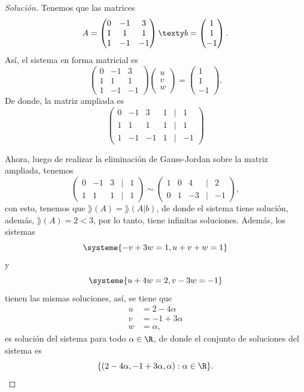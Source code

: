 \documentclass[a4,11pt]{aleph-notas}
\begin{document}
\begin{proof}[Solución]
    Tenemos que las matrices
    \[
        A = \begin{pmatrix}
            0&-1&3\\1&1&1\\1&-1&-1
        \end{pmatrix}
        \texty
        b = \begin{pmatrix}
            1 \\ 1\\ -1
        \end{pmatrix}.
    \]
    Así, el sistema en forma matricial es
    \[
        \begin{pmatrix}
            0&-1&3\\1&1&1\\1&-1&-1
        \end{pmatrix}
        \begin{pmatrix}
            u \\ v\\ w
        \end{pmatrix}
        =
        \begin{pmatrix}
            1 \\ 1\\ -1
        \end{pmatrix}.
    \]
    De donde, la matriz ampliada es
    \[
        \begin{pmatrix}
            0&-1&3&1&|&1\\
            1&1&1&1&|&1\\
            1&-1&-1&1&|&-1
        \end{pmatrix}
    \]
    
    Ahora, luego de realizar la eliminación de Gauss-Jordan sobre la matriz ampliada, tenemos
    \[
        \begin{pmatrix}
            0&-1&3&|&1\\
            1&1&1&|&1
        \end{pmatrix}
        \sim 
        \begin{pmatrix}
            1&0&4&|&2\\
            0&1&-3&|&-1
        \end{pmatrix},
    \]
    con esto, tenemos que $\rang(A)=\rang(A|b)$, de donde el sistema tiene solución, además, $\rang(A)=2<3$, por lo tanto, tiene infinitas soluciones. Además, los sistemas
    \[
        \systeme{
        -v+3w=1, u+v+w=1
        }
    \]
    y
    \[
        \systeme{
        u+4w=2,v-3w=-1
        }
    \]
    tienen las mismas soluciones, así, se tiene que
    \begin{align*}
        u & = 2-4\alpha\\
        v & = -1+3\alpha\\
        w & = \alpha,
    \end{align*}
    es solución del sistema para todo $\alpha\in\R$, de donde el conjunto de soluciones del sistema es
    \[  
        \{(2-4\alpha,-1+3\alpha,\alpha):\alpha\in\R\}.\qedhere
    \]
\end{proof}
\end{document}

